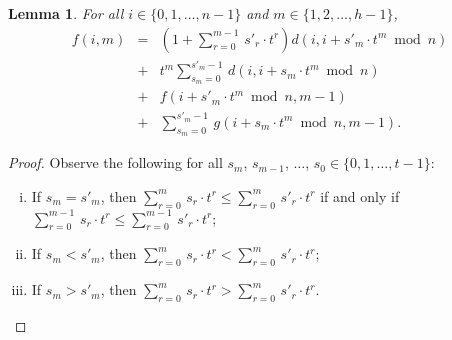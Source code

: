 \documentclass[letterpaper,12pt]{article}
\newtheorem{lemma}[theorem]{Lemma}
\begin{document}
\begin{lemma}
\label{recurrencelemma2}
For all $i\in\{0,1,\ldots,n-1\}$ and $m\in\{1,2,\ldots,h-1\}$,
\begin{eqnarray}
f\left(i,m\right)
&=&
\left(1+\sum_{r=0}^{m-1}\, s'_r\cdot t^r\right) d\left(i,i+s'_m\cdot
t^m\bmod{n}\right)\nonumber\\
&+&
t^m
\sum_{s_m=0}^{s'_m-1}\,
d\left(i,i+s_m\cdot t^m\bmod{n}\right)\nonumber\\
&+&
f\left(i+s'_m\cdot t^m\bmod{n},m-1\right)\nonumber\\
&+&\sum_{s_m=0}^{s'_m-1}\, g\left(i+s_m\cdot t^m\bmod{n},m-1
\right).
\nonumber
\end{eqnarray}
\end{lemma}
\begin{proof}
Observe
the following
for all
$s_m$, $s_{m-1}$, $\ldots$, $s_0\in\{0,1,\ldots,t-1\}$:
\begin{enumerate}[(i)]
\item\label{item1}
If $s_m=s'_m$, then
$\sum_{r=0}^m\, s_r\cdot t^r\le \sum_{r=0}^m\, s'_r\cdot t^r$
if and only if
$\sum_{r=0}^{m-1}\, s_r\cdot t^r\le \sum_{r=0}^{m-1}\, s'_r\cdot t^r$;
\item\label{item2}
If $s_m<s'_m$, then
$\sum_{r=0}^m\, s_r\cdot t^r< \sum_{r=0}^m\, s'_r\cdot t^r$;
\item\label{item3}
If $s_m>s'_m$, then
$\sum_{r=0}^m\, s_r\cdot t^r> \sum_{r=0}^m\, s'_r\cdot t^r$.
\end{enumerate}


\end{proof}
\end{document}
